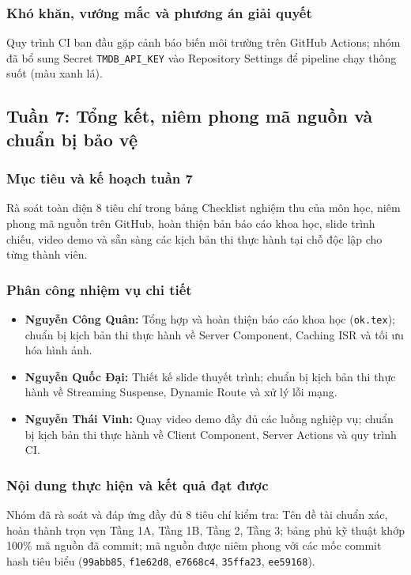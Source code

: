 \documentclass[13pt,a4paper]{extarticle}
\begin{document}
\subsubsection{Khó khăn, vướng mắc và phương án giải quyết}
Quy trình CI ban đầu gặp cảnh báo biến môi trường trên GitHub Actions; nhóm đã bổ sung Secret \texttt{TMDB\_API\_KEY} vào Repository Settings để pipeline chạy thông suốt (màu xanh lá).

\subsection{Tuần 7: Tổng kết, niêm phong mã nguồn và chuẩn bị bảo vệ}

\subsubsection{Mục tiêu và kế hoạch tuần 7}
Rà soát toàn diện 8 tiêu chí trong bảng Checklist nghiệm thu của môn học, niêm phong mã nguồn trên GitHub, hoàn thiện bản báo cáo khoa học, slide trình chiếu, video demo và sẵn sàng các kịch bản thi thực hành tại chỗ độc lập cho từng thành viên.

\subsubsection{Phân công nhiệm vụ chi tiết}
\begin{itemize}[noitemsep]
    \item \textbf{Nguyễn Công Quân:} Tổng hợp và hoàn thiện báo cáo khoa học (\texttt{ok.tex}); chuẩn bị kịch bản thi thực hành về Server Component, Caching ISR và tối ưu hóa hình ảnh.
    \item \textbf{Nguyễn Quốc Đại:} Thiết kế slide thuyết trình; chuẩn bị kịch bản thi thực hành về Streaming Suspense, Dynamic Route và xử lý lỗi mạng.
    \item \textbf{Nguyễn Thái Vinh:} Quay video demo đầy đủ các luồng nghiệp vụ; chuẩn bị kịch bản thi thực hành về Client Component, Server Actions và quy trình CI.
\end{itemize}

\subsubsection{Nội dung thực hiện và kết quả đạt được}
Nhóm đã rà soát và đáp ứng đầy đủ 8 tiêu chí kiểm tra: Tên đề tài chuẩn xác, hoàn thành trọn vẹn Tầng 1A, Tầng 1B, Tầng 2, Tầng 3; bảng phủ kỹ thuật khớp 100\% mã nguồn đã commit; mã nguồn được niêm phong với các mốc commit hash tiêu biểu (\texttt{99abb85}, \texttt{f1e62d8}, \texttt{e7668c4}, \texttt{35ffa23}, \texttt{ee59168}).
\end{document}
